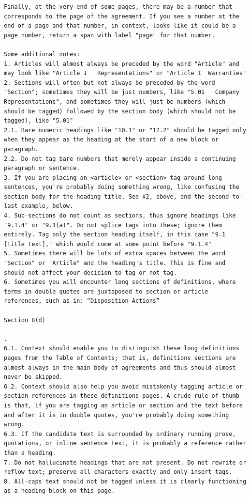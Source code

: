 \documentclass[12pt]{article}
\begin{document}
{\begin{appendices}
\begin{verbatim}
Finally, at the very end of some pages, there may be a number that corresponds to the page of the agreement. If you see a number at the end of a page and that number, in context, looks like it could be a page number, return a span with label "page" for that number.

Some additional notes:
1. Articles will almost always be preceded by the word "Article" and may look like "Article I   Representations" or "Article 1  Warranties"
2. Sections will often but not always be preceded by the word "Section"; sometimes they will be just numbers, like "5.01   Company Representations", and sometimes they will just be numbers (which should be tagged) followed by the section body (which should not be tagged), like "5.01"
2.1. Bare numeric headings like "10.1" or "12.2" should be tagged only when they appear as the heading at the start of a new block or paragraph.
2.2. Do not tag bare numbers that merely appear inside a continuing paragraph or sentence.
3. If you are placing an <article> or <section> tag around long sentences, you're probably doing something wrong, like confusing the section body for the heading title. See #2, above, and the second-to-last example, below.
4. Sub-sections do not count as sections, thus ignore headings like "9.1.4" or "9.1(a)". Do not splice tags into these; ignore them entirely. Tag only the section heading itself, in this case "9.1 [title text]," which would come at some point before "9.1.4"
5. Sometimes there will be lots of extra spaces between the word "Section" or "Article" and the heading's title. This is fine and should not affect your decision to tag or not tag.
6. Sometimes you will encounter long sections of definitions, where terms in double quotes are juxtaposed to section or article references, such as in: “Disposition Actions”

Section 8(d)

.
6.1. Context should enable you to distinguish these long definitions pages from the Table of Contents; that is, definitions sections are almost always in the main body of agreements and thus should almost never be skipped.
6.2. Context should also help you avoid mistakenly tagging article or section references in these definitions pages. A crude rule of thumb is that, if you are tagging an article or section and the text before and after it is in double quotes, you're probably doing something wrong.
6.3. If the candidate text is surrounded by ordinary running prose, quotations, or inline sentence text, it is probably a reference rather than a heading.
7. Do not hallucinate headings that are not present. Do not rewrite or reflow text; preserve all characters exactly and only insert tags.
8. All-caps text should not be tagged unless it is clearly functioning as a heading block on this page.
\end{verbatim}
\endgroup


\end{appendices}}
\end{document}
